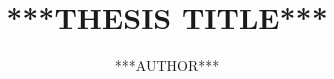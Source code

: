 \documentclass{ucrthesis-2chair}
\title{***THESIS TITLE***}
\author{***AUTHOR***}
\begin{document}
\maketitle

\copyrightpage{}

\approvalpage{}
\cleardoublepage


\begin{frontmatter}
	\setcounter{page}{4}


	
	\cleardoublepage


	
	\cleardoublepage

	
	\cleardoublepage

	\tableofcontents
	\cleardoublepage


	\listoffigures
	\cleardoublepage


	\listoftables
	\cleardoublepage

\end{frontmatter}




\end{document}

